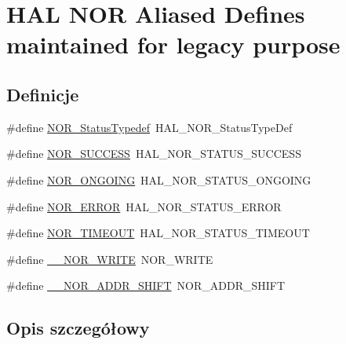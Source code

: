 \hypertarget{group___h_a_l___n_o_r___aliased___defines}{}\section{H\+AL N\+OR Aliased Defines maintained for legacy purpose}
\label{group___h_a_l___n_o_r___aliased___defines}
\subsection*{Definicje}
\begin{DoxyCompactItemize}
\item 
\#define \hyperlink{group___h_a_l___n_o_r___aliased___defines_ga279519672efdd52720bbf3b701c03286}{N\+O\+R\+\_\+\+Status\+Typedef}~H\+A\+L\+\_\+\+N\+O\+R\+\_\+\+Status\+Type\+Def
\item 
\#define \hyperlink{group___h_a_l___n_o_r___aliased___defines_ga5f4df82c08207d51443ddd3516510578}{N\+O\+R\+\_\+\+S\+U\+C\+C\+E\+SS}~H\+A\+L\+\_\+\+N\+O\+R\+\_\+\+S\+T\+A\+T\+U\+S\+\_\+\+S\+U\+C\+C\+E\+SS
\item 
\#define \hyperlink{group___h_a_l___n_o_r___aliased___defines_gac80642cc21e52c08c95cad9bbb1bfe7a}{N\+O\+R\+\_\+\+O\+N\+G\+O\+I\+NG}~H\+A\+L\+\_\+\+N\+O\+R\+\_\+\+S\+T\+A\+T\+U\+S\+\_\+\+O\+N\+G\+O\+I\+NG
\item 
\#define \hyperlink{group___h_a_l___n_o_r___aliased___defines_gab9f3025f50c2dcddae291485261981b0}{N\+O\+R\+\_\+\+E\+R\+R\+OR}~H\+A\+L\+\_\+\+N\+O\+R\+\_\+\+S\+T\+A\+T\+U\+S\+\_\+\+E\+R\+R\+OR
\item 
\#define \hyperlink{group___h_a_l___n_o_r___aliased___defines_ga3b0bf7d05266f4dfb03d8dcb2093ab07}{N\+O\+R\+\_\+\+T\+I\+M\+E\+O\+UT}~H\+A\+L\+\_\+\+N\+O\+R\+\_\+\+S\+T\+A\+T\+U\+S\+\_\+\+T\+I\+M\+E\+O\+UT
\item 
\#define \hyperlink{group___h_a_l___n_o_r___aliased___defines_ga7b65a23e48189016e4f22ba4b84773ad}{\+\_\+\+\_\+\+N\+O\+R\+\_\+\+W\+R\+I\+TE}~N\+O\+R\+\_\+\+W\+R\+I\+TE
\item 
\#define \hyperlink{group___h_a_l___n_o_r___aliased___defines_ga0fbcfd18de611ae4687a6bc41f427249}{\+\_\+\+\_\+\+N\+O\+R\+\_\+\+A\+D\+D\+R\+\_\+\+S\+H\+I\+FT}~N\+O\+R\+\_\+\+A\+D\+D\+R\+\_\+\+S\+H\+I\+FT
\end{DoxyCompactItemize}


\subsection{Opis szczegółowy}


